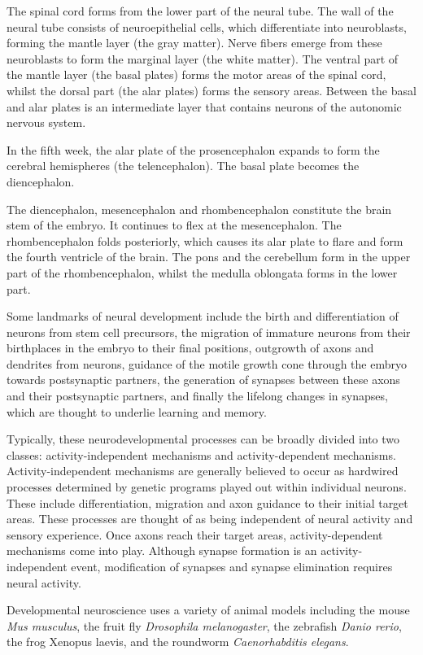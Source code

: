 The spinal cord forms from the lower part of the neural tube. The wall of the neural tube consists of neuroepithelial cells, which differentiate into neuroblasts, forming the mantle layer (the gray matter). Nerve fibers emerge from these neuroblasts to form the marginal layer (the white matter). The ventral part of the mantle layer (the basal plates) forms the motor areas of the spinal cord, whilst the dorsal part (the alar plates) forms the sensory areas. Between the basal and alar plates is an intermediate layer that contains neurons of the autonomic nervous system.

In the fifth week, the alar plate of the prosencephalon expands to form the cerebral hemispheres (the telencephalon). The basal plate becomes the diencephalon.

The diencephalon, mesencephalon and rhombencephalon constitute the brain stem of the embryo. It continues to flex at the mesencephalon. The rhombencephalon folds posteriorly, which causes its alar plate to flare and form the fourth ventricle of the brain. The pons and the cerebellum form in the upper part of the rhombencephalon, whilst the medulla oblongata forms in the lower part.

Some landmarks of neural development include the birth and differentiation of neurons from stem cell precursors, the migration of immature neurons from their birthplaces in the embryo to their final positions, outgrowth of axons and dendrites from neurons, guidance of the motile growth cone through the embryo towards postsynaptic partners, the generation of synapses between these axons and their postsynaptic partners, and finally the lifelong changes in synapses, which are thought to underlie learning and memory.

Typically, these neurodevelopmental processes can be broadly divided into two classes: activity-independent mechanisms and activity-dependent mechanisms. Activity-independent mechanisms are generally believed to occur as hardwired processes determined by genetic programs played out within individual neurons. These include differentiation, migration and axon guidance to their initial target areas. These processes are thought of as being independent of neural activity and sensory experience. Once axons reach their target areas, activity-dependent mechanisms come into play. Although synapse formation is an activity-independent event, modification of synapses and synapse elimination requires neural activity.

Developmental neuroscience uses a variety of animal models including the mouse \emph{Mus musculus}, the fruit fly \emph{Drosophila melanogaster}, the zebrafish \emph{Danio rerio}, the frog Xenopus laevis, and the roundworm \emph{Caenorhabditis elegans}.

